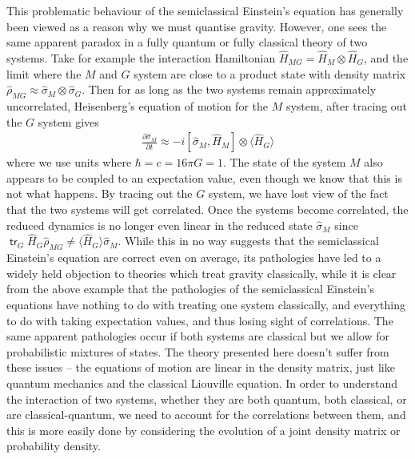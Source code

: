\documentclass[aps,pra,showpacs,citeautoscript,amsmath,amssymb,floatfix,superscriptaddress,bbm, verbatim,amsfonts,changes,12pt,nofootinbib,longbibliography]{revtex4-2}
\newcommand{\tr}{\mathop{\mathsf{tr}}\nolimits}
\begin{document}
This problematic behaviour of the semiclassical Einstein's equation has generally been viewed as a reason why we must quantise gravity\cite{dewitt1953new,duff1980inconsistency,unruh1984steps,carlip2008quantum}. However, one sees the same apparent paradox in a fully quantum or fully classical theory of two systems. Take for example the interaction Hamiltonian $\hat{H}_{MG}=\hat{H}_M\otimes \hat{H}_G$, and the limit where the $M$ and $G$ system are close to a product state with density matrix $\hat{\rho}_{MG}\approx\hat{\sigma}_M\otimes\hat{\sigma}_G$.
Then for as long as the two systems remain approximately uncorrelated, Heisenberg's equation of motion for the $M$ system, after tracing out the $G$ system gives
\begin{align}
\frac{\partial \hat{\sigma}_M}{\partial t}\approx -i[\hat{\sigma}_M,\hat{H}_M]\otimes\langle \hat{H}_G \rangle
\label{eq:homer-semi}
\end{align}
where we use units where $\hbar=c=16\pi G=1$.
The state of the system $M$ also appears to be coupled to an expectation value, even though we know that this is not what happens. By tracing out the $G$ system, we have lost view of the fact that the two systems will get correlated. Once the systems become correlated, the reduced dynamics is no longer even linear in the reduced state $\hat{\sigma}_M$ since $\tr_G \hat{H}_G\hat{\rho}_{MG}\neq \langle \hat{H}_G\rangle\hat{\sigma}_M$. 
While this in no way suggests that the semiclassical Einstein's equation are correct even on average, its pathologies have led to a widely held objection to theories which treat gravity classically, while it is clear from the above example that the pathologies of the semiclassical Einstein's equations have nothing to do with treating one system classically, and everything to do with taking expectation values, and thus losing sight of correlations. The same apparent pathologies occur if both systems are classical but we allow for probabilistic mixtures of states. The theory presented here doesn't suffer from these issues -- the equations of motion are linear in the density matrix, just like quantum mechanics and the classical Liouville equation.  In order to understand the interaction of two systems, whether they are both quantum, both classical, or are classical-quantum, we need to account for the correlations between them, and this is more easily done by considering the evolution of a joint density matrix or probability density.
\end{document}
